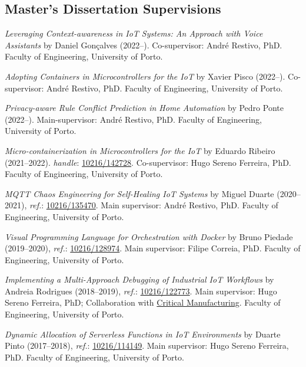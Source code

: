 \documentclass[10pt, a4paper]{article}
\newcommand{\FEUP}{Faculty of Engineering, University of Porto}
\begin{document}
\subsection*{Master's Dissertation Supervisions}

\begin{etaremune}
	\renewcommand\labelenumi{\footnotesize\theenumi .}
	\item \textit{Leveraging Context-awareness in IoT Systems: An Approach with Voice Assistants} by Daniel Gonçalves (2022--).
	Co-supervisor: André Restivo, PhD. \FEUP.
	
	\item \textit{Adopting Containers in Microcontrollers for the IoT} by Xavier Pisco (2022--).
	Co-supervisor: André Restivo, PhD. \FEUP.

	\item \textit{Privacy-aware Rule Conflict Prediction in Home Automation} by Pedro Ponte (2022--).
	Main-supervisor: André Restivo, PhD. \FEUP.

	\item \textit{Micro-containerization in Microcontrollers for the IoT} by Eduardo Ribeiro (2021--2022). \textit{handle}: \href{http://hdl.handle.net/10216/142728}{10216/142728}.
	Co-supervisor: Hugo Sereno Ferreira, PhD. \FEUP.
	
	\item \textit{MQTT Chaos Engineering for Self-Healing IoT Systems} by Miguel Duarte (2020--2021), \textit{ref.}: \href{https://hdl.handle.net/10216/135470}{10216/135470}. Main supervisor: André Restivo, PhD. \FEUP.
	
	\item \textit{Visual Programming Language for Orchestration with Docker} by Bruno Piedade (2019--2020), \textit{ref.}: \href{http://hdl.handle.net/10216/128974}{10216/128974}. Main supervisor: Filipe Correia, PhD. \FEUP.
	
	\item \textit{Implementing a Multi-Approach Debugging of Industrial IoT Workflows} by Andreia Rodrigues (2018--2019), \textit{ref.}: \href{http://hdl.handle.net/10216/122773}{10216/122773}. Main supervisor: Hugo Sereno Ferreira, PhD; Collaboration with \href{https://www.criticalmanufacturing.com/}{Critical Manufacturing}. \FEUP.
	
	\item \textit{Dynamic Allocation of Serverless Functions in IoT Environments} by Duarte Pinto (2017--2018), \textit{ref.}: \href{http://hdl.handle.net/10216/114149}{10216/114149}. Main supervisor: Hugo Sereno Ferreira, PhD. \FEUP.
	

\end{etaremune}
\end{document}
